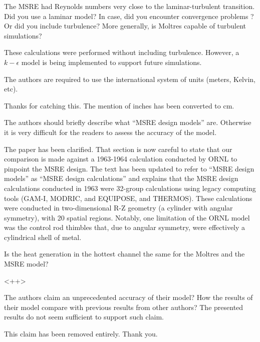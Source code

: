 \documentclass[answers,11pt]{exam}
\begin{document}
\begin{questions}
\question The MSRE had Reynolds numbers very close to the laminar-turbulent
transition. Did you use a laminar model? In case, did you encounter convergence
problems ?  Or did you include turbulence? More generally, is Moltres capable of
turbulent simulations?
\begin{solution}
        These calculations were performed without including turbulence. However,
        a $k-\epsilon$ model is being implemented to support future simulations.
\end{solution}

\question The authors are required to use the international system of units (meters, Kelvin, etc).
\begin{solution}
        Thanks for catching this. The mention of inches has been converted to cm.
\end{solution}

\question The authors should briefly describe what ``MSRE design models''
are. Otherwise it is very difficult for the readers to assess the accuracy of
the model.
\begin{solution}
        The paper has been clarified. That section is now careful to state that
        our comparison is made against a 1963-1964 calculation conducted by ORNL
        to pinpoint the MSRE design. The text has been updated to refer to
        ``MSRE design models'' as ``MSRE design calculations'' and explains
        that the MSRE design calculations conducted in 1963 were 32-group
        calculations using legacy computing tools (GAM-I, MODRIC, and EQUIPOSE,
        and THERMOS). These calculations were conducted in two-dimensional R-Z
        geometry (a cylinder with angular symmetry), with 20 spatial regions.
        Notably, one limitation of the ORNL model was the control rod thimbles
        that, due to angular symmetry, were effectively a cylindrical shell of
        metal.
\end{solution}

\question Is the heat generation in the hottest channel the same for the Moltres and the MSRE model?
\begin{solution}
        <++>
\end{solution}

\question The authors claim an unprecedented accuracy of their model? How the
results of their model compare with previous results from other authors? The
presented results do not seem sufficient to support such claim.
\begin{solution}
        This claim has been removed entirely. Thank you.
\end{solution}


\end{questions}
\end{document}
